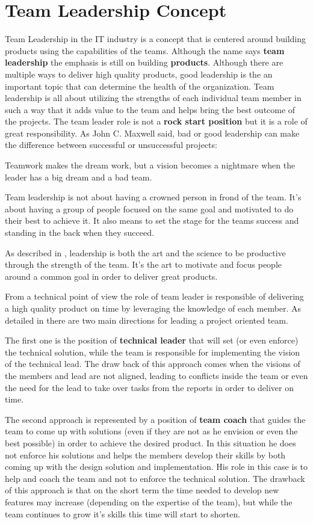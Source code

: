 \section{Team Leadership Concept}
\label{sec:tl}
Team Leadership in the IT industry is a concept that is centered around building products using the capabilities of the teams. Although the name says \textbf{team leadership} the emphasis is still on building \textbf{products}. Although there are multiple ways to deliver high quality products, good leadership is the an important topic that can determine the health of the organization. Team leadership is all about utilizing the strengths of each individual team member in such a way that it adds value to the team and helps bring the best outcome of the projects. The team leader role is not a \textbf{rock start position} but it is a role of great responsibility. As John C. Maxwell said, bad or good leadership can make the difference between successful or unsuccessful projects:
\begin{displayquote}
Teamwork makes the dream work, but a vision becomes a nightmare when the leader has a big dream and a bad team.
\end{displayquote}
Team leadership is not about having a crowned person in frond of the team. It's about having a group of people focused on the same goal and motivated to do their best to achieve it. It also means to set the stage for the teams success and standing in the back when they succeed. 

As described in \cite{abur-tl}, leadership is both the art and the science to be productive through the strength of the team. It's the art to motivate and focus people around a common goal in order to deliver great products.

From a technical point of view the role of team leader is responsible of delivering a high quality product on time by leveraging the knowledge of each member. As detailed in  there are two main directions for leading a project oriented team.

The first one is the position of \textbf{technical leader} that will set (or even enforce) the technical solution, while the team is responsible for implementing the vision of the technical lead. The draw back of this approach comes when the visions of the members and lead are not aligned, leading to conflicts inside the team or even the need for the lead to take over tasks from the reports in order to deliver on time.

The second approach is represented by a position of \textbf{team coach} that guides the team to come up with solutions (even if they are not as he envision or even the best possible) in order to achieve the desired product. In this situation he does not enforce his solutions and helps the members develop their skills by both coming up with the design solution and implementation. His role in this case is to help and coach the team and not to enforce the technical solution. The drawback of this approach is that on the short term the time needed to develop new features may increase (depending on the expertise of the team), but while the team continues to grow it's skills this time will start to shorten.

